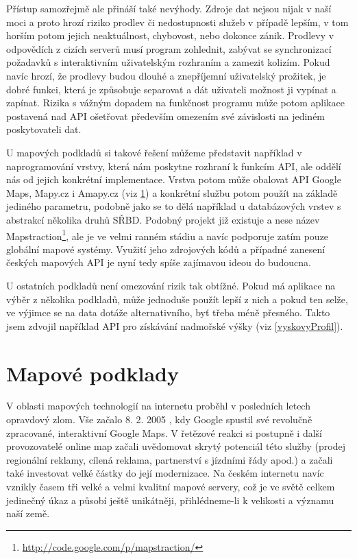 Přístup samozřejmě ale přináší také nevýhody. Zdroje dat nejsou nijak
v naší moci a proto hrozí riziko prodlev či nedostupnosti služeb v
případě lepším, v tom horším potom jejich neaktuálnost, chybovost, nebo
dokonce zánik. Prodlevy v odpovědích z cizích serverů musí program
zohlednit, zabývat se synchronizací požadavků s interaktivním
uživatelským rozhraním a zamezit kolizím. Pokud navíc hrozí, že 
prodlevy budou dlouhé a znepříjemní uživatelský prožitek, je dobré
funkci, která je způsobuje separovat a dát uživateli možnost ji
vypínat a zapínat. Rizika s vážným dopadem na funkčnost programu může
potom aplikace postavená nad API ošetřovat především omezením své
závislosti na jediném poskytovateli dat.

U mapových podkladů si takové řešení můžeme představit například v
naprogramování vrstvy, která nám poskytne rozhraní k funkcím API,
ale oddělí nás od jejich konkrétní implementace. Vrstva potom může
obalovat API Google Maps, Mapy.cz i Amapy.cz (viz \ref{vybermap}) a
konkrétní službu potom použít na základě jediného parametru, podobně
jako se to dělá například u databázových vrstev s abstrakcí
několika druhů SŘBD. Podobný projekt již existuje a nese název
Mapstraction\footnote{\url{http://code.google.com/p/mapstraction/}},
ale je ve velmi ranném stádiu a navíc podporuje zatím pouze globální
mapové systémy. Využití jeho zdrojových kódů a případné zanesení českých
mapových API je nyní tedy spíše zajímavou ideou do budoucna.

U ostatních podkladů není omezování rizik tak obtížné. Pokud má
aplikace na výběr z několika podkladů, může jednoduše použít lepší z
nich a pokud ten selže, ve výjimce se na data dotáže alternativního,
byť třeba méně přesného. Takto jsem zdvojil například API pro
získávání nadmořské výšky (viz \ref{vyskovyProfil}).

\section{Mapové podklady}\label{vybermap}
V oblasti mapových technologií na internetu proběhl v
posledních letech opravdový zlom. Vše začalo 8. 2.
2005 \cite{gmaps}, kdy Google spustil své revolučně zpracované,
interaktivní Google Maps. V řetězové reakci si postupně i další
provozovatelé online map začali uvědomovat skrytý potenciál této
služby (prodej regionální reklamy, cílená reklama, partnerství s
jízdními řády apod.) a začali také investovat velké částky do její
modernizace. Na českém internetu navíc vznikly časem tři velké a
velmi kvalitní mapové servery, což je ve světě celkem jedinečný úkaz
a působí ještě unikátněji, přihlédneme-li k velikosti a významu naší
země.

